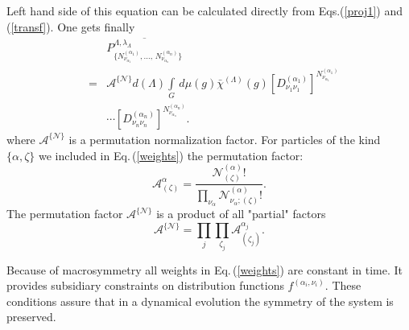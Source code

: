 \documentclass[a4paper]{article}
\begin{document}
Left hand side of this equation can be calculated directly from
Eqs.(\ref{proj1}) and (\ref{transf}). One gets finally
\begin{eqnarray}
 &&\overline{P^{\Lambda,\lambda_{\Lambda}}_{\{N^{(\alpha_1)}_{\nu_{\alpha_1}},
\dots,\,N^{(\alpha_n)}_{\nu_{\alpha_n}}\}}}\nonumber\\[4pt]
&=&{\mathcal A}^{\{{\mathcal N}\}}
d(\Lambda)\int\limits_G\,d\mu(g)\bar\chi^{(\Lambda)}(g)
[D^{(\alpha_1)}_{\nu_1\nu_1}]^{N^{(\alpha_1)}_{\nu_{\alpha_1}}}\nonumber\\[4pt]
&&\cdots
[D^{(\alpha_n)}_{\nu_n\nu_n}]^{N^{(\alpha_n)}_{\nu_{\alpha_n}}} .
\label{weights}
\end{eqnarray}
where ${\mathcal A}^{\{{\mathcal N}\}}$ is a permutation
normalization factor. For particles of the kind $\{\alpha,\zeta\}$
we included in Eq.\,(\ref{weights}) the permutation factor:
\begin{equation}\label{permfac1}
{\mathcal A}^\alpha_{(\zeta)}= \frac{{\mathcal
N}^{(\alpha)}_{(\zeta)}!}{\prod\limits_{\nu_\alpha} {\mathcal
N}^{(\alpha)}_{\nu_\alpha;(\zeta)}!} .
\end{equation}
The permutation factor ${\mathcal A}^{\{{\mathcal N}\}}$ is a
product of all "partial" factors
\begin{equation}\label{permfactor}
{\mathcal A}^{\{{\mathcal N}\}}=
\prod\limits_j\prod_{\zeta_j}{\mathcal A}^{\alpha_j}_{(\zeta_j)}.
\end{equation}

Because of macrosymmetry all weights in Eq.\,(\ref{weights}) are
constant in time. It provides subsidiary constraints on
distribution functions $f^{(\alpha_i,\nu_i)}$. These conditions
assure that in a dynamical evolution the symmetry of the system is
preserved.
\end{document}
